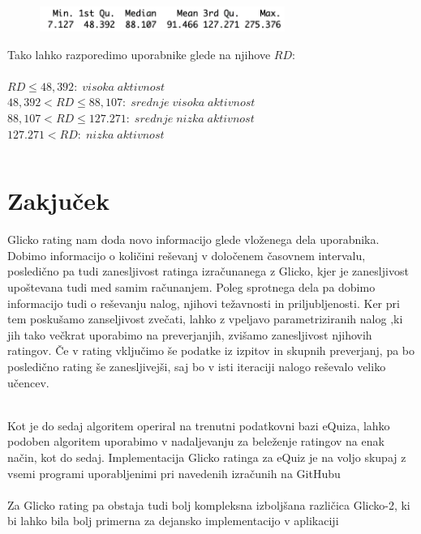 \documentclass{IEEEtran}
\begin{document}
\begin{figure}[h!]
    \includegraphics[width=8cm]{RDstat}
    \label{fig:example}%
\end{figure}

Tako lahko razporedimo uporabnike glede na njihove $RD$:
\hfill
\\
\\
$RD\leq48,392:\;visoka\;aktivnost$
\hfill
\\
$48,392<RD\leq88,107:\;srednje\;visoka\;aktivnost$
\hfill
\\
$88,107<RD\leq127.271:\;srednje\;nizka\;aktivnost$
\hfill
\\
$127.271<RD:\;nizka\;aktivnost$
\hfill




\lstset{basicstyle=\tiny,style=SQLstyle}
\begin{lstlisting}
\end{lstlisting}



\newpage
\section{Zakjuček}
\label{sec:cnc}

Glicko rating nam doda novo informacijo glede vloženega dela uporabnika. Dobimo informacijo o količini reševanj v določenem časovnem intervalu, posledično pa tudi zanesljivost ratinga izračunanega z Glicko, kjer je zanesljivost upoštevana tudi med samim računanjem. Poleg sprotnega dela pa dobimo informacijo tudi o reševanju nalog, njihovi težavnosti in priljubljenosti. Ker pri tem poskušamo zanseljivost zvečati, lahko z vpeljavo parametriziranih nalog
,ki jih tako večkrat uporabimo na preverjanjih, zvišamo zanesljivost njihovih ratingov. Če v rating vključimo še podatke iz izpitov in skupnih preverjanj, pa bo posledično rating še zanesljivejši, saj bo v isti iteraciji nalogo reševalo veliko učencev.

\hfill
\\
Kot je do sedaj algoritem operiral na trenutni podatkovni bazi eQuiza, lahko podoben algoritem uporabimo v nadaljevanju za beleženje ratingov na enak način, kot do sedaj. Implementacija Glicko ratinga za eQuiz je na voljo skupaj z vsemi programi uporabljenimi pri navedenih izračunih na GitHubu %
\hfill
\\
\\
Za Glicko rating pa obstaja tudi bolj kompleksna izboljšana različica Glicko-2, ki bi lahko bila bolj primerna za dejansko implementacijo v aplikaciji %



\end{document}
